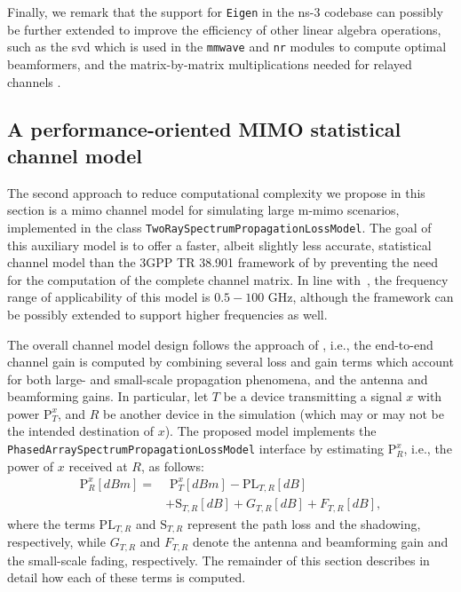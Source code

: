 Finally, we remark that the support for \texttt{Eigen} in the ns-3 codebase can possibly be further extended to improve the efficiency of other linear algebra operations, such as the \gls{svd} which is used in the \texttt{mmwave} and \texttt{nr} modules to compute optimal beamformers, and the matrix-by-matrix multiplications needed for relayed channels \cite{9810370}.

\subsection{A performance-oriented MIMO statistical channel model}
\label{sec:opt_design}

The second approach to reduce computational complexity we propose in this section is a 
\gls{mimo} channel model for simulating large \gls{m-mimo} scenarios, implemented in the class \texttt{Two\-Ray\-Spectrum\-Propagation\-Loss\-Model}. The goal of this auxiliary model is to offer a faster, albeit slightly less accurate, statistical channel model than the 3GPP TR 38.901 framework of \cite{tommaso:20} by preventing the need for the computation of the complete channel matrix. In line with~\cite{TR38901}, the frequency range of applicability of this model is $0.5 - 100$ GHz, although the framework can be possibly extended to support higher frequencies as well.

The overall channel model design follows the approach of \cite{8445856}, i.e., the end-to-end channel gain is computed by combining several loss and gain terms which account for both large- and small-scale propagation phenomena, and the antenna and beamforming gains.
In particular, let $T$ be a device transmitting a signal $x$ with power $\mathrm{P}_T^x$, and $R$ be another device in the simulation (which may or may not be the intended destination of
$x$). 
The proposed model implements the \texttt{Phased\-Array\-Spectrum\-Propagation\-Loss\-Model} interface by estimating $\mathrm{P}_R^x$, i.e., the power of $x$ received at $R$, as follows:
\begin{align}
\mathrm{P}_R^x[d B m] =& \,\, \mathrm{P}_T^x[d B m] - \mathrm{PL}_{T, R}[d B] \\
        &+ \mathrm{S}_{T, R}[d B] + G_{T, R}[d B] + F_{T, R}[d B], \nonumber
\end{align}
where the terms $\mathrm{PL}_{T, R}$ and $\mathrm{S}_{T, R}$ represent the path loss and the shadowing, respectively, while $G_{T, R}$ and $F_{T, R}$ denote the antenna and beamforming gain and the small-scale fading, respectively. The remainder of this section describes in detail how each of these terms is computed.

